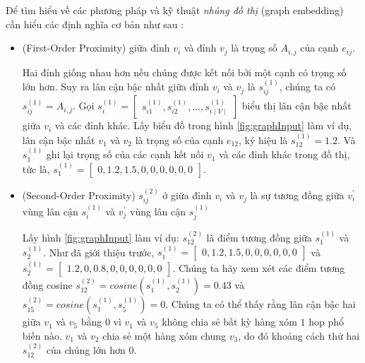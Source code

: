 Để tìm hiểu về các phương pháp và kỹ thuật \textit{nhúng đồ thị} (graph embedding) cần hiểu các định nghĩa cơ bản như sau : 	

\begin{itemize}
	\item
	\begin{definition}\label{def:firstOrderProximity}
		(First-Order Proximity)	giữa đỉnh $v_i$ và đỉnh $v_j$ là trọng số $A_{i, j}$ của cạnh $e_{ij}$.
	\end{definition}
	
	Hai đỉnh giống nhau hơn nếu chúng được kết nối bởi một cạnh có trọng số lớn hơn. Suy ra lân cận bậc nhất giữa đỉnh $v_i$ và $v_j$ là $s^{(1)}_{ij}$, chúng ta có $s^{(1)}_{ij} = A_{i, j}$. Gọi $s^{(1)}_{i} = \begin{bmatrix} s^{(1)}_{i1}, s^{(1)}_{i2}, \dots, s^{(1)}_{i \mid V \mid} \end{bmatrix}$ biểu thị lân cận bậc nhất giữa \(v_i\) và các đỉnh khác. Lấy biểu đồ trong hình \ref{fig:graphInput} làm ví dụ, lân cận bậc nhất $v_1$ và $v_2$ là trọng số của cạnh $e_{12}$, ký hiệu là $s^{(1)}_{12} = 1.2$. Và $s^{(1)}_1$ ghi lại trọng số của các cạnh kết nối $v_1$ và các đỉnh khác trong đồ thị, tức là, $s^{(1)}_{1} = \begin{bmatrix}  0, 1.2, 1.5, 0, 0, 0, 0, 0, 0 \end{bmatrix} $.
	
	\item
	\begin{definition}\label{def:secondOrderProximity} (Second-Order Proximity)
		$s^{(2)}_{ij}$ ở giữa đỉnh $v_i$ và $v_j$ là sự tương đồng giữa $v^{\prime}_i$ vùng lân cận $s^{(1)}_i$ và $v^{\prime}_j$ vùng lân cận $s^{(1)}_j$
	\end{definition}
	
	Lấy hình \ref{fig:graphInput} làm ví dụ: $s^{(2)}_{12}$ là điểm tương đồng giữa $s^{(1)}_{1}$ và $s^{(1)}_{2}$. Như đã giới thiệu trước, $s^{(1)}_1 = \begin{bmatrix} 0, 1.2, 1.5, 0, 0, 0, 0, 0, 0 \end{bmatrix}$ và $s^{(1)}_2 = \begin{bmatrix} 1.2, 0, 0.8, 0, 0, 0, 0 , 0, 0 \end{bmatrix}$. Chúng ta hãy xem xét các điểm tương đồng cosine $s^{(2)}_{12} = cosine (s^{(1)}_1, s^{(1)}_2) = 0.43$ và $s^{(2)}_{15} = cosine(s^{(1)}_1, s^{(1)}_5) = 0$. Chúng ta có thể thấy rằng lân cận bậc hai giữa $v_1$ và $v_5$ bằng $0$ vì $v_1$ và $v_5$ không chia sẻ bất kỳ hàng xóm $1$ hop phổ biến nào. $v_1$ và $v_2$ chia sẻ một hàng xóm chung $v_3$, do đó khoảng cách thứ hai $s^{(2)}_{12}$ của chúng lớn hơn 0.
	

\end{itemize}
